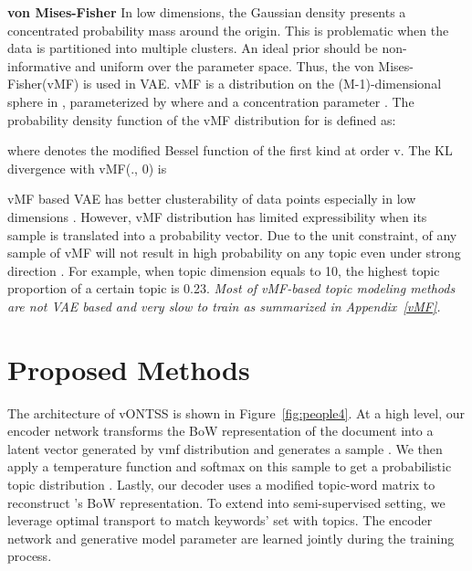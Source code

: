 \documentclass[11pt]{article}
\begin{document}
\textbf{von Mises-Fisher} In low dimensions, the Gaussian density presents a concentrated probability mass around the origin. This is problematic when the data is partitioned into multiple clusters. An ideal prior should be non-informative and uniform over the parameter space. Thus, the von Mises-Fisher(vMF) is used in VAE. vMF is a distribution on the (M-1)-dimensional sphere in , parameterized by  where  and a concentration parameter . The probability density function of the vMF distribution for  is defined as:





where  denotes the modified Bessel function of the first kind at order v. The KL divergence with vMF(., 0) \cite{davidson2018hyperspherical} is



 


vMF based VAE has better clusterability of data points especially in low dimensions \cite{guu2018generating}. However, vMF distribution has limited expressibility when its sample is translated into a probability vector. Due to the unit constraint,  of any sample of vMF will not result in high probability on any topic even under strong direction . For example, when topic dimension  equals to 10, the highest topic proportion of a certain topic is 0.23. \textit{Most of vMF-based topic modeling methods are not VAE based and very slow to train as summarized in Appendix~\ref{vMF}.}














\section{Proposed Methods}




The architecture of vONTSS is shown in Figure~\ref{fig:people4}. At a high level, our encoder network  transforms the BoW representation of the document  into a latent vector generated by vmf distribution and generates a sample . We then apply a temperature function  and softmax on this sample to get a probabilistic topic distribution . Lastly, our decoder uses a modified topic-word matrix  to reconstruct 's BoW representation. To extend into semi-supervised setting, we leverage optimal transport to match keywords' set with topics. The encoder network  and generative model parameter  are learned jointly during the training process.
\end{document}
